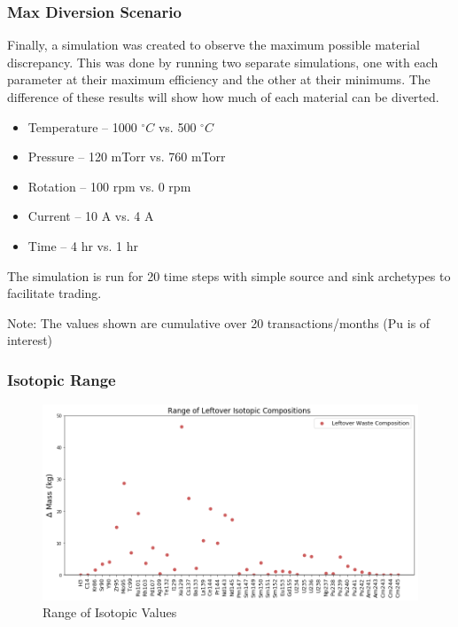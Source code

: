 \begin{frame}
\frametitle{Max Diversion Scenario}
Finally, a simulation was created to observe the maximum possible material discrepancy.
This was done by running two separate simulations, one with each parameter at their maximum
efficiency and the other at their minimums. The difference of these results will show how much of each material can be diverted.
\begin{itemize}
	\item Temperature -- 1000 $^\circ C$ vs. 500 $^\circ C$
	\item Pressure -- 120 mTorr vs. 760 mTorr
	\item Rotation -- 100 rpm vs. 0 rpm
	\item Current -- 10 A vs. 4 A
	\item Time -- 4 hr vs. 1 hr
\end{itemize}
The simulation is run for 20 time steps with simple source and sink archetypes to facilitate trading.

Note: The values shown are cumulative over 20 transactions/months (Pu is of interest)
\end{frame}

\begin{frame}
  \frametitle{Isotopic Range}
  \begin{figure}
  	\centering
  	\includegraphics[width=\linewidth]{isotopic-comp-range}
  	\caption{Range of Isotopic Values}
  	\label{fig:isotopic-range}
  \end{figure}
\end{frame}

